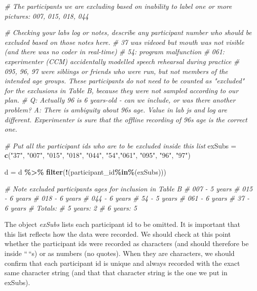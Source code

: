 \documentclass[
  12pt,
]{book}
\newenvironment{Shaded}{\begin{snugshade}}{\end{snugshade}}
\newcommand{\CommentTok}[1]{\textcolor[rgb]{0.56,0.35,0.01}{\textit{#1}}}
\newcommand{\FunctionTok}[1]{\textcolor[rgb]{0.13,0.29,0.53}{\textbf{#1}}}
\newcommand{\NormalTok}[1]{#1}
\newcommand{\OtherTok}[1]{\textcolor[rgb]{0.56,0.35,0.01}{#1}}
\newcommand{\SpecialCharTok}[1]{\textcolor[rgb]{0.81,0.36,0.00}{\textbf{#1}}}
\newcommand{\StringTok}[1]{\textcolor[rgb]{0.31,0.60,0.02}{#1}}
\begin{document}
\begin{Shaded}
\begin{Highlighting}[]
\CommentTok{\# The participants we are excluding based on inability to label one or more pictures: 007, 015, 018, 044}

\CommentTok{\# Checking your lab\textquotesingle{}s log or notes, describe any participant number who should be excluded based on those notes here.}
\CommentTok{\# 37 was videoed but mouth was not visible (and there was no coder in real{-}time)}
\CommentTok{\# 54: program malfunction}
\CommentTok{\# 061: experimenter (CCM) accidentally modelled speech rehearsal during practice}
\CommentTok{\# 095, 96, 97 were siblings or friends who were run, but not members of the intended age groups. These participants do not need to be counted as "excluded" for the exclusions in Table B, because they were not sampled according to our plan.}
\CommentTok{\# Q: Actually 96 is 6 years{-}old {-} can we include, or was there another problem? A: There is ambiguity about 96\textquotesingle{}s age. Value in lab js and log are different. Experimenter is sure that the offline recording of 96\textquotesingle{}s age is the correct one.}

\CommentTok{\# Put all the participant ids who are to be excluded inside this list}
\NormalTok{exSubs }\OtherTok{=} \FunctionTok{c}\NormalTok{(}\StringTok{"37"}\NormalTok{, }\StringTok{"007"}\NormalTok{, }\StringTok{"015"}\NormalTok{, }\StringTok{"018"}\NormalTok{, }\StringTok{"044"}\NormalTok{, }\StringTok{"54"}\NormalTok{,}\StringTok{"061"}\NormalTok{, }\StringTok{"095"}\NormalTok{, }\StringTok{"96"}\NormalTok{, }\StringTok{"97"}\NormalTok{)}

\NormalTok{d }\OtherTok{=}\NormalTok{ d }\SpecialCharTok{\%\textgreater{}\%} \FunctionTok{filter}\NormalTok{(}\SpecialCharTok{!}\NormalTok{(participant\_id}\SpecialCharTok{\%in\%}\NormalTok{(exSubs)))}

\CommentTok{\# Note excluded participants ages for inclusion in Table B}
\CommentTok{\# 007 {-} 5 years}
\CommentTok{\# 015 {-} 6 years}
\CommentTok{\# 018 {-} 6 years}
\CommentTok{\# 044 {-} 6 years}
\CommentTok{\# 54 {-} 5 years}
\CommentTok{\# 061 {-} 6 years}
\CommentTok{\# 37 {-} 6 years}
\CommentTok{\# Totals:}
\CommentTok{\# 5 years: 2}
\CommentTok{\# 6 years: 5}
\end{Highlighting}
\end{Shaded}

The object \emph{exSubs} lists each participant id to be omitted. It is important that this list reflects how the data were recorded. We should check at this point whether the participant ids were recorded as characters (and should therefore be inside ``\,``s) or as numbers (no quotes). When they are characters, we should confirm that each participant id is unique and always recorded with the exact same character string (and that that character string is the one we put in exSubs).
\end{document}
